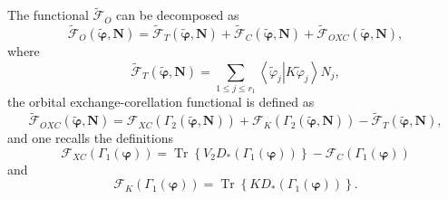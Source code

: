 \documentclass[aps,preprint]{revtex4}%
\begin{document}
The functional $\mathcal{\tilde{F}}_{O}$ can be decomposed as
\begin{equation}
\mathcal{\tilde{F}}_{O}\left(  \boldsymbol{\tilde{\varphi},N}\right)
=\mathcal{\tilde{F}}_{T}\left(  \boldsymbol{\tilde{\varphi},N}\right)
+\mathcal{\tilde{F}}_{C}\left(  \boldsymbol{\tilde{\varphi},N}\right)
+\mathcal{\tilde{F}}_{OXC}\left(  \boldsymbol{\tilde{\varphi},N}\right)  ,
\end{equation}
where
\begin{equation}
\mathcal{\tilde{F}}_{T}\left(  \boldsymbol{\tilde{\varphi},N}\right)
=\sum_{1\leq j\leq r_{1}}\left\langle \tilde{\varphi}_{j}\left\vert
K\tilde{\varphi}_{j}\right.  \right\rangle N_{j},
\end{equation}
the orbital exchange-corellation functional is defined as
\begin{equation}
\mathcal{\tilde{F}}_{OXC}\left(  \boldsymbol{\tilde{\varphi},N}\right)
=\mathcal{F}_{XC}\left(  \Gamma_{2}\left(  \boldsymbol{\tilde{\varphi}%
,N}\right)  \right)  +\mathcal{F}_{K}\left(  \Gamma_{2}\left(
\boldsymbol{\tilde{\varphi},N}\right)  \right)  -\mathcal{\tilde{F}}%
_{T}\left(  \boldsymbol{\tilde{\varphi},N}\right)  ,
\end{equation}
and one recalls the definitions
\begin{equation}
\mathcal{F}_{XC}\left(  \Gamma_{1}\left(  \boldsymbol{\varphi}\right)
\right)  =\operatorname{Tr}\left\{  V_{2}D_{\ast}\left(  \Gamma_{1}\left(
\boldsymbol{\varphi}\right)  \right)  \right\}  -\mathcal{F}_{C}\left(
\Gamma_{1}\left(  \boldsymbol{\varphi}\right)  \right)
\end{equation}
and
\begin{equation}
\mathcal{F}_{K}\left(  \Gamma_{1}\left(  \boldsymbol{\varphi}\right)  \right)
=\operatorname{Tr}\left\{  KD_{\ast}\left(  \Gamma_{1}\left(
\boldsymbol{\varphi}\right)  \right)  \right\}  .
\end{equation}
\end{document}
